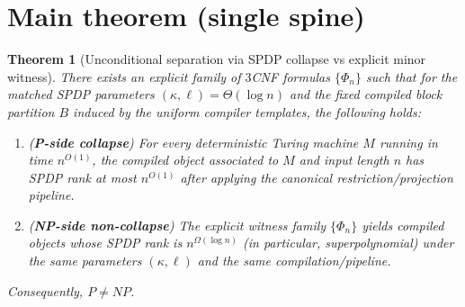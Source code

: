 \documentclass[12pt]{article}
\newtheorem{theorem}{Theorem}
\theoremstyle{definition}
\theoremstyle{definition}
\theoremstyle{remark}
\theoremstyle{remark}
\begin{document}

\section{Main theorem (single spine)}
\label{sec:main-theorem-final}

\begin{theorem}[Unconditional separation via SPDP collapse vs explicit minor witness]
\label{thm:main-final}
There exists an explicit family of $3$CNF formulas $\{\Phi_n\}$ such that for the matched
SPDP parameters $(\kappa,\ell)=\Theta(\log n)$ and the fixed compiled block partition $B$ induced
by the uniform compiler templates, the following holds:

\begin{enumerate}
\item (\textbf{P-side collapse}) For every deterministic Turing machine $M$ running in time
$n^{O(1)}$, the compiled object associated to $M$ and input length $n$ has SPDP rank at most
$n^{O(1)}$ after applying the canonical restriction/projection pipeline.

\item (\textbf{NP-side non-collapse}) The explicit witness family $\{\Phi_n\}$ yields compiled
objects whose SPDP rank is $n^{\Omega(\log n)}$ (in particular, superpolynomial) under the
same parameters $(\kappa,\ell)$ and the same compilation/pipeline.

\end{enumerate}

Consequently, $P\neq NP$.
\end{theorem}
\end{document}

